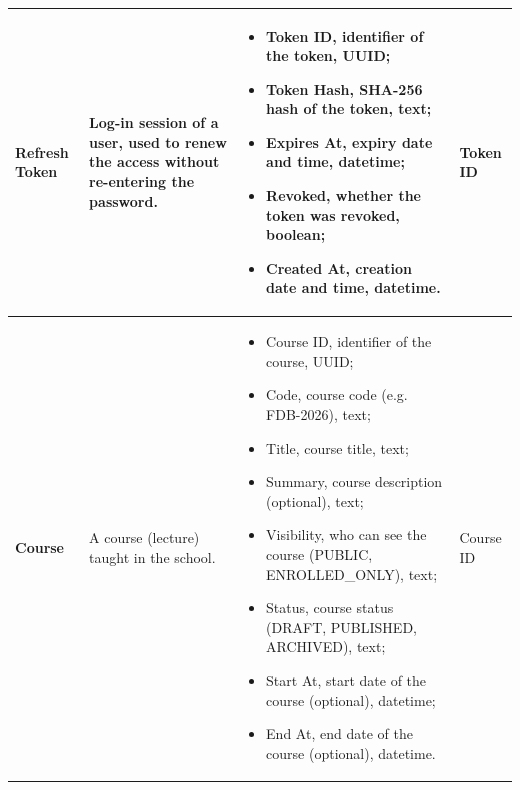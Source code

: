 {\begin{longtable}{|p{}|p{}|p{}|p{}|}
    \textbf{Refresh Token} & Log-in session of a user, used to renew the access without re-entering the password. &
    \begin{itemize}[leftmargin=*,nosep,before=\vspace{-\baselineskip}\leavevmode,after=\vspace{-\baselineskip}]
        \item Token ID, identifier of the token, UUID;
        \item Token Hash, SHA-256 hash of the token, text;
        \item Expires At, expiry date and time, datetime;
        \item Revoked, whether the token was revoked, boolean;
        \item Created At, creation date and time, datetime.
    \end{itemize}
    & Token ID \\ \hline

    \textbf{Course} & A course (lecture) taught in the school. &
    \begin{itemize}[leftmargin=*,nosep,before=\vspace{-\baselineskip}\leavevmode,after=\vspace{-\baselineskip}]
        \item Course ID, identifier of the course, UUID;
        \item Code, course code (e.g. FDB-2026), text;
        \item Title, course title, text;
        \item Summary, course description (optional), text;
        \item Visibility, who can see the course (PUBLIC, ENROLLED\_ONLY), text;
        \item Status, course status (DRAFT, PUBLISHED, ARCHIVED), text;
        \item Start At, start date of the course (optional), datetime;
        \item End At, end date of the course (optional), datetime.
    \end{itemize}
    & Course ID \\ \hline


\end{longtable}}

